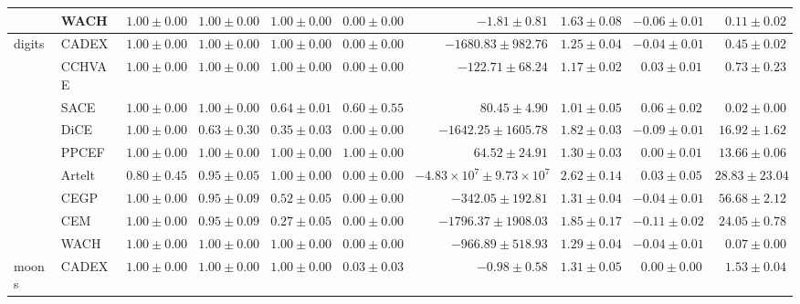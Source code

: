 \begin{table}[ht]
\begin{center}
\begin{sc}
\begin{scriptsize}
\begin{tabular}{l|l|rrrrrrrr}
 & WACH & $\boldsymbol{1.00\pm{0.00}}$ & $\boldsymbol{1.00\pm{0.00}}$ & $\boldsymbol{1.00\pm{0.00}}$ & $0.00\pm{0.00}$ & $-1.81\pm{0.81}$ & $1.63\pm{0.08}$ & $-0.06\pm{0.01}$ & $0.11\pm{0.02}$ \\
\midrule
\multirow{9}{*}{digits} & CADEX & $\boldsymbol{1.00\pm{0.00}}$ & $\boldsymbol{1.00\pm{0.00}}$ & $\boldsymbol{1.00\pm{0.00}}$ & $0.00\pm{0.00}$ & $-1680.83\pm{982.76}$ & $1.25\pm{0.04}$ & $-0.04\pm{0.01}$ & $0.45\pm{0.02}$ \\
 & CCHVAE & $\boldsymbol{1.00\pm{0.00}}$ & $\boldsymbol{1.00\pm{0.00}}$ & $\boldsymbol{1.00\pm{0.00}}$ & $0.00\pm{0.00}$ & $-122.71\pm{68.24}$ & $1.17\pm{0.02}$ & $0.03\pm{0.01}$ & $0.73\pm{0.23}$ \\
 & SACE & $\boldsymbol{1.00\pm{0.00}}$ & $\boldsymbol{1.00\pm{0.00}}$ & $0.64\pm{0.01}$ & $0.60\pm{0.55}$ & $\boldsymbol{80.45\pm{4.90}}$ & $\boldsymbol{1.01\pm{0.05}}$ & $\boldsymbol{0.06\pm{0.02}}$ & $\boldsymbol{0.02\pm{0.00}}$ \\
 & DiCE & $\boldsymbol{1.00\pm{0.00}}$ & $0.63\pm{0.30}$ & $0.35\pm{0.03}$ & $0.00\pm{0.00}$ & $-1642.25\pm{1605.78}$ & $1.82\pm{0.03}$ & $-0.09\pm{0.01}$ & $16.92\pm{1.62}$ \\
 & PPCEF & $\boldsymbol{1.00\pm{0.00}}$ & $\boldsymbol{1.00\pm{0.00}}$ & $\boldsymbol{1.00\pm{0.00}}$ & $\boldsymbol{1.00\pm{0.00}}$ & $64.52\pm{24.91}$ & $1.30\pm{0.03}$ & $0.00\pm{0.01}$ & $13.66\pm{0.06}$ \\
 & Artelt & $0.80\pm{0.45}$ & $0.95\pm{0.05}$ & $\boldsymbol{1.00\pm{0.00}}$ & $0.00\pm{0.00}$ & $-4.83\times 10^{7}\pm{9.73\times 10^{7}}$ & $2.62\pm{0.14}$ & $0.03\pm{0.05}$ & $28.83\pm{23.04}$ \\
 & CEGP & $\boldsymbol{1.00\pm{0.00}}$ & $0.95\pm{0.09}$ & $0.52\pm{0.05}$ & $0.00\pm{0.00}$ & $-342.05\pm{192.81}$ & $1.31\pm{0.04}$ & $-0.04\pm{0.01}$ & $56.68\pm{2.12}$ \\
 & CEM & $\boldsymbol{1.00\pm{0.00}}$ & $0.95\pm{0.09}$ & $0.27\pm{0.05}$ & $0.00\pm{0.00}$ & $-1796.37\pm{1908.03}$ & $1.85\pm{0.17}$ & $-0.11\pm{0.02}$ & $24.05\pm{0.78}$ \\
 & WACH & $\boldsymbol{1.00\pm{0.00}}$ & $\boldsymbol{1.00\pm{0.00}}$ & $\boldsymbol{1.00\pm{0.00}}$ & $0.00\pm{0.00}$ & $-966.89\pm{518.93}$ & $1.29\pm{0.04}$ & $-0.04\pm{0.01}$ & $0.07\pm{0.00}$ \\
\midrule
\multirow{9}{*}{moons} & CADEX & $\boldsymbol{1.00\pm{0.00}}$ & $\boldsymbol{1.00\pm{0.00}}$ & $\boldsymbol{1.00\pm{0.00}}$ & $0.03\pm{0.03}$ & $-0.98\pm{0.58}$ & $1.31\pm{0.05}$ & $0.00\pm{0.00}$ & $1.53\pm{0.04}$ \\

\end{tabular}
\end{scriptsize}
\end{sc}
\end{center}
\end{table}

